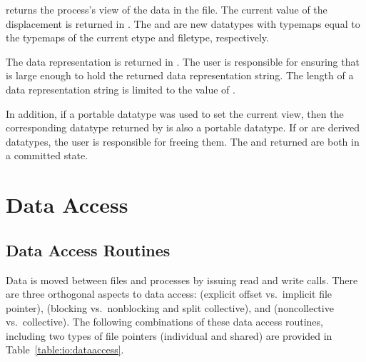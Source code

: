  returns the process's view
of the data in the file.
The current value of the displacement is returned in .
The  and  are new datatypes
with typemaps equal to the typemaps
of the current etype and filetype, respectively.

The data representation is returned in .
The user is responsible for ensuring that  is
large enough to hold the returned data representation string.
The length of a data representation string is limited to the value of
.

In addition, if a portable datatype was used to set the current view,
then the corresponding datatype returned by 
is also a portable datatype.
If  or  are derived datatypes,
the user is responsible for freeing them.
The  and  returned are both in a
committed state.

\section{Data Access}
\label{sec:io-access}

\subsection{Data Access Routines}

Data is moved between files and processes by issuing read and write calls.
There are three orthogonal aspects to data access:
 (explicit offset vs.\ implicit file pointer),
 (blocking vs.\ nonblocking and split collective),
and  (noncollective vs.\ collective).
The following combinations of these data access routines,
including two types of file pointers (individual and shared)
are provided in Table~\ref{table:io:dataaccess}.

